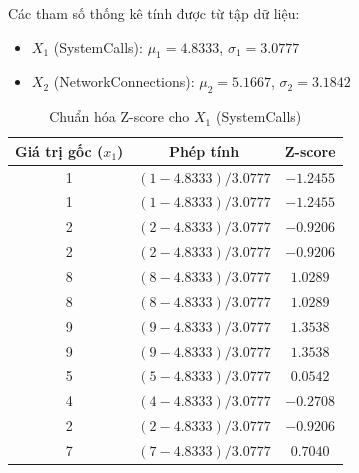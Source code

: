 \documentclass[12pt,a4paper]{article}
\begin{document}
Các tham số thống kê tính được từ tập dữ liệu:
\begin{itemize}
    \item $X_1$ (SystemCalls): $\mu_1 = 4.8333$, $\sigma_1 = 3.0777$
    \item $X_2$ (NetworkConnections): $\mu_2 = 5.1667$, $\sigma_2 = 3.1842$
\end{itemize}

\begin{table}[H]
    \centering
    \caption{Chuẩn hóa Z-score cho $X_1$ (SystemCalls)}
    \vspace{0.2cm}
    \renewcommand{\arraystretch}{1.4}
    \begin{tabular}{ccc}
        \toprule
        \textbf{Giá trị gốc ($x_1$)} & \textbf{Phép tính} & \textbf{Z-score} \\
        \midrule
        1 & $(1 - 4.8333) / 3.0777$ & $-1.2455$ \\
        1 & $(1 - 4.8333) / 3.0777$ & $-1.2455$ \\
        2 & $(2 - 4.8333) / 3.0777$ & $-0.9206$ \\
        2 & $(2 - 4.8333) / 3.0777$ & $-0.9206$ \\
        8 & $(8 - 4.8333) / 3.0777$ & $1.0289$ \\
        8 & $(8 - 4.8333) / 3.0777$ & $1.0289$ \\
        9 & $(9 - 4.8333) / 3.0777$ & $1.3538$ \\
        9 & $(9 - 4.8333) / 3.0777$ & $1.3538$ \\
        5 & $(5 - 4.8333) / 3.0777$ & $0.0542$ \\
        4 & $(4 - 4.8333) / 3.0777$ & $-0.2708$ \\
        2 & $(2 - 4.8333) / 3.0777$ & $-0.9206$ \\
        7 & $(7 - 4.8333) / 3.0777$ & $0.7040$ \\
        \bottomrule
    \end{tabular}
\end{table}
\end{document}
